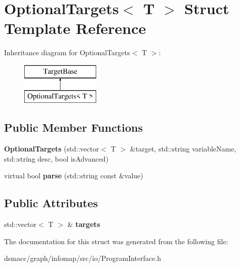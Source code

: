 \hypertarget{structOptionalTargets}{}\section{Optional\+Targets$<$ T $>$ Struct Template Reference}
\label{structOptionalTargets}
Inheritance diagram for Optional\+Targets$<$ T $>$\+:\begin{figure}[H]
\begin{center}
\leavevmode
\includegraphics[height=2.000000cm]{structOptionalTargets}
\end{center}
\end{figure}
\subsection*{Public Member Functions}
\begin{DoxyCompactItemize}
\item 
\mbox{\label{structOptionalTargets_a475647b1d1ed39ce6de203615366180a}} 
{\bfseries Optional\+Targets} (std\+::vector$<$ T $>$ \&target, std\+::string variable\+Name, std\+::string desc, bool is\+Advanced)
\item 
\mbox{\label{structOptionalTargets_a81f40212365412672b5fadc7e8d87803}} 
virtual bool {\bfseries parse} (std\+::string const \&value)
\end{DoxyCompactItemize}
\subsection*{Public Attributes}
\begin{DoxyCompactItemize}
\item 
\mbox{\label{structOptionalTargets_a22c2ae1b0ad9e8aec3c4d297457cc013}} 
std\+::vector$<$ T $>$ \& {\bfseries targets}
\end{DoxyCompactItemize}


The documentation for this struct was generated from the following file\+:\begin{DoxyCompactItemize}
\item 
dsmacc/graph/infomap/src/io/Program\+Interface.\+h\end{DoxyCompactItemize}
